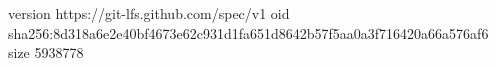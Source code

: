 version https://git-lfs.github.com/spec/v1
oid sha256:8d318a6e2e40bf4673e62c931d1fa651d8642b57f5aa0a3f716420a66a576af6
size 5938778
